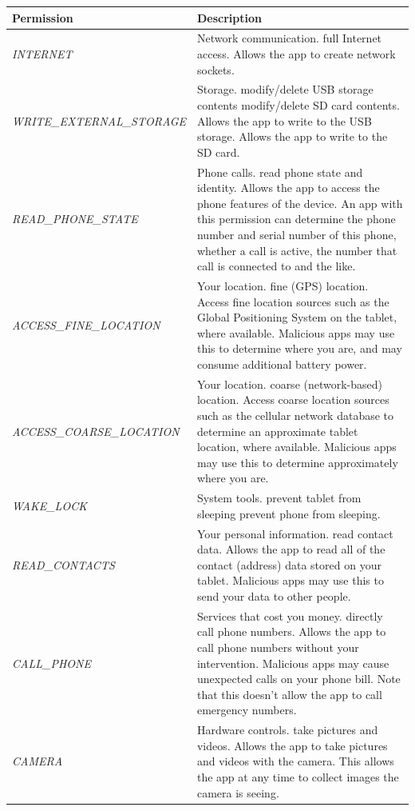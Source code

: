 \begin{table}[t]
\begin{small}
\begin{tabular}{p{3cm}|p{12.5cm}}
Permission  & Description \\
\hline

\textit{INTERNET} & Network communication. full Internet access. Allows the app to create network sockets.  \\
\textit{WRITE\_EXTERNAL\_\-STORAGE} & Storage. modify/delete USB storage contents modify/delete SD card contents. Allows the app to write to the USB storage.  Allows the app to write to the SD card.  \\
\textit{READ\_PHONE\_STATE} & Phone calls. read phone state and identity. Allows the app to access the phone features of the device.  An app with this permission can determine the phone number and serial number of this phone, whether a call is active, the number that call is connected to and the like.  \\
\textit{ACCESS\_FINE\_\-LOCATION} & Your location. fine (GPS) location. Access fine location sources such as the Global Positioning System on the tablet, where available.  Malicious apps may use this to determine where you are, and may consume additional battery power.  \\
\textit{ACCESS\_COARSE\_\-LOCATION} & Your location. coarse (network-based) location. Access coarse location sources such as the cellular network database to determine an approximate tablet location, where available.  Malicious apps may use this to determine approximately where you are. \\
\textit{WAKE\_LOCK} & System tools. prevent tablet from sleeping prevent phone from sleeping. \\
\textit{READ\_CONTACTS} & Your personal information. read contact data. Allows the app to read all of the contact (address) data stored on your tablet.  Malicious apps may use this to send your data to other people. \\
\textit{CALL\_PHONE} & Services that cost you money. directly call phone numbers. Allows the app to call phone numbers without your intervention.  Malicious apps may cause unexpected calls on your phone bill.  Note that this doesn't allow the app to call emergency numbers.  \\
\textit{CAMERA} & Hardware controls. take pictures and videos. Allows the app to take pictures and videos with the camera.  This allows the app at any time to collect images the camera is seeing.  \\

\end{tabular}
\end{small}
\end{table}
